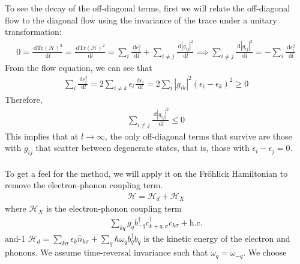 \documentclass[twoside]{report}
\numberwithin{equation}{section}
\begin{document}
To see the decay of the off-diagonal terms, first we will relate the off-diagonal flow to the diagonal flow using the invariance of the trace under a unitary transformation:
\begin{equation}\begin{aligned}
	0 = \frac{\:\mathrm{d}\text{Tr}\left( \mathcal{H} \right) ^2}{\:\mathrm{d}l} = \frac{\:\mathrm{d}\text{Tr}\left( \mathcal{H} \right) ^2}{\:\mathrm{d}l} = \sum_i \frac{\:\mathrm{d} \epsilon_i^2 }{\:\mathrm{d}l} + \sum_{i\neq j}\frac{\:\mathrm{d}|g_{ij}|^2}{\:\mathrm{d}l} \implies \sum_{i\neq j}\frac{\:\mathrm{d}|g_{ij}|^2}{\:\mathrm{d}l} = -\sum_i \frac{\:\mathrm{d} \epsilon_i^2 }{\:\mathrm{d}l}
\end{aligned}\end{equation}
From the flow equation, we can see that
\begin{equation}\begin{aligned}
	\sum_i \frac{\:\mathrm{d} \epsilon_i^2 }{\:\mathrm{d}l} = 2\sum_{i \neq k} \epsilon_i \frac{\:\mathrm{d} \epsilon_i }{\:\mathrm{d}l} = 2 \sum_i |g_{ik}|^2 \left( \epsilon_i - \epsilon_k \right) ^2 \geq 0
\end{aligned}\end{equation}
Therefore,
\begin{equation}\begin{aligned}
	\sum_{i\neq j}\frac{\:\mathrm{d}|g_{ij}|^2}{\:\mathrm{d}l} \leq 0
\end{aligned}\end{equation}
This implies that at \(l \to \infty\), the only off-diagonal terms that survive are those with \(g_{ij}\) that scatter between degenerate states, that is, those with \(\epsilon_i - \epsilon_j = 0\).
\\\\To get a feel for the method, we will apply it on the Fröhlick Hamiltonian to remove the electron-phonon coupling term. 
\begin{equation}\begin{aligned}
\mathcal{H} = \mathcal{H}_d + \mathcal{H}_X
\end{aligned}\end{equation}
where \(\mathcal{H}_X\) is the electron-phonon coupling term
\begin{equation}\begin{aligned}
\sum_{kq}g_{q}b^\dagger_{-q}c^\dagger_{k+q,\sigma}c_{k\sigma} + \text{h.c.}
\end{aligned}\end{equation}
and-1 \(\mathcal{H}_d = \sum_{k\sigma}\epsilon_k \hat n_{k\sigma} + \sum_q \hbar\omega_q b^\dagger_q b_q\) is the kinetic energy of the electron and phonons. We assume time-reversal invariance such that \(\omega_q = \omega_{-q}\). We choose
\end{document}
